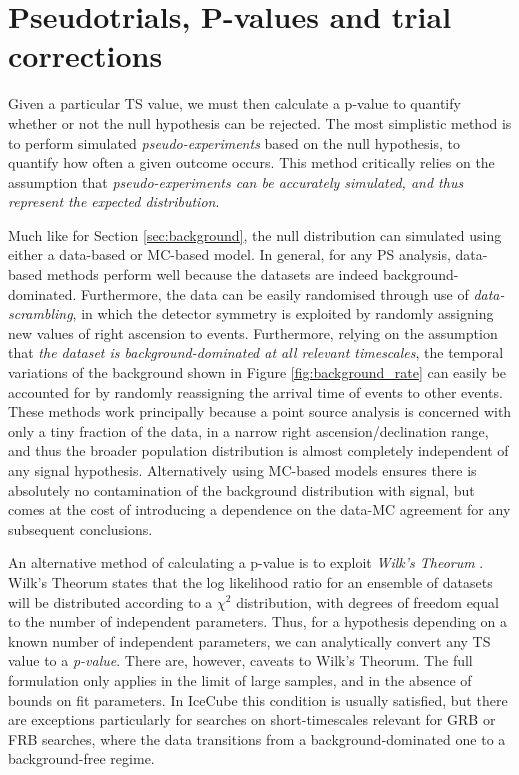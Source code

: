 \section{Pseudotrials, P-values and trial corrections}
\label{sec:pvalues}

Given a particular TS value, we must then calculate a p-value to quantify whether or not the null hypothesis can be rejected. The most simplistic method is to perform simulated \emph{pseudo-experiments} based on the null hypothesis, to quantify how often a given outcome occurs. This method critically relies on the assumption that \emph{pseudo-experiments can be accurately simulated, and thus represent the expected distribution}. 

Much like for Section \ref{sec:background}, the null distribution can simulated using either a data-based or MC-based model. In general, for any PS analysis, data-based methods perform well because the datasets are indeed background-dominated. Furthermore, the data can be easily randomised through use of \emph{data-scrambling}, in which the detector symmetry is exploited by randomly assigning new values of right ascension to events. Furthermore, relying on the assumption that \emph{the dataset is background-dominated at all relevant timescales}, the temporal variations of the background shown in Figure \ref{fig:background_rate} can easily be accounted for by randomly reassigning the arrival time of events to other events. These methods work principally because a point source analysis is concerned with only a tiny fraction of the data, in a narrow right ascension/declination range, and thus the broader population distribution is almost completely independent of any signal hypothesis. Alternatively using MC-based models ensures there is absolutely no contamination of the background distribution with signal, but comes at the cost of introducing a dependence on the data-MC agreement for any subsequent conclusions.

An alternative method of calculating a p-value is to exploit \emph{Wilk's Theorum} . Wilk's Theorum states that the log likelihood ratio for an ensemble of datasets will be distributed according to a $\chi^{2}$ distribution, with degrees of freedom equal to the number of independent parameters. Thus, for a hypothesis depending on a known number of independent parameters, we can analytically convert any TS value to a \emph{p-value}. There are, however, caveats to Wilk's Theorum. The full formulation only applies in the limit of large samples, and in the absence of bounds on fit parameters. In IceCube this condition is usually satisfied, but there are exceptions particularly for searches on short-timescales relevant for GRB or FRB searches, where the data transitions from a background-dominated one to a background-free regime.

